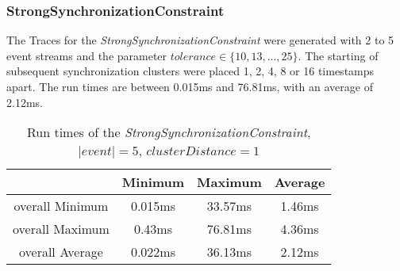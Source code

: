 \subsubsection{StrongSynchronizationConstraint}
The Traces for the \textit{StrongSynchronizationConstraint} were generated with 2 to 5 event streams and the parameter $tolerance\in\{10, 13, ..., 25\}$. The starting of subsequent synchronization clusters were placed 1, 2, 4, 8 or 16 timestamps apart. The run times are between 0.015ms and 76.81ms, with an average of 2.12ms. 
\begin{table}
	\begin{tabular}{|c|c|c|c|}
		\hline
		& Minimum &  Maximum &  Average \\
		\hline
		overall Minimum & 0.015ms & 33.57ms & 1.46ms\\
		\hline
		overall Maximum & 0.43ms & 76.81ms & 4.36ms\\
		\hline
		overall Average & 0.022ms & 36.13ms & 2.12ms\\
		\hline
	\end{tabular}

	\centering
	\caption{Run times of the \textit{StrongSynchronizationConstraint}, $|event|=5$, $clusterDistance=1$}
	\label{tab:runtimeStrongSynchronization}
\end{table}


